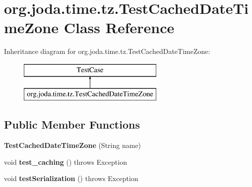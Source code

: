 \hypertarget{classorg_1_1joda_1_1time_1_1tz_1_1_test_cached_date_time_zone}{\section{org.\-joda.\-time.\-tz.\-Test\-Cached\-Date\-Time\-Zone Class Reference}
\label{classorg_1_1joda_1_1time_1_1tz_1_1_test_cached_date_time_zone}
}
Inheritance diagram for org.\-joda.\-time.\-tz.\-Test\-Cached\-Date\-Time\-Zone\-:\begin{figure}[H]
\begin{center}
\leavevmode
\includegraphics[height=2.000000cm]{classorg_1_1joda_1_1time_1_1tz_1_1_test_cached_date_time_zone}
\end{center}
\end{figure}
\subsection*{Public Member Functions}
\begin{DoxyCompactItemize}
\item 
\hypertarget{classorg_1_1joda_1_1time_1_1tz_1_1_test_cached_date_time_zone_aefe44e6a56f0bf8acd02cc7dcb97d1f3}{{\bfseries Test\-Cached\-Date\-Time\-Zone} (String name)}\label{classorg_1_1joda_1_1time_1_1tz_1_1_test_cached_date_time_zone_aefe44e6a56f0bf8acd02cc7dcb97d1f3}

\item 
\hypertarget{classorg_1_1joda_1_1time_1_1tz_1_1_test_cached_date_time_zone_a358a9573a6eace0304159a284c794604}{void {\bfseries test\-\_\-caching} ()  throws Exception }\label{classorg_1_1joda_1_1time_1_1tz_1_1_test_cached_date_time_zone_a358a9573a6eace0304159a284c794604}

\item 
\hypertarget{classorg_1_1joda_1_1time_1_1tz_1_1_test_cached_date_time_zone_a4073c055de4ed2fe75f26f7254541048}{void {\bfseries test\-Serialization} ()  throws Exception }\label{classorg_1_1joda_1_1time_1_1tz_1_1_test_cached_date_time_zone_a4073c055de4ed2fe75f26f7254541048}

\end{DoxyCompactItemize}
